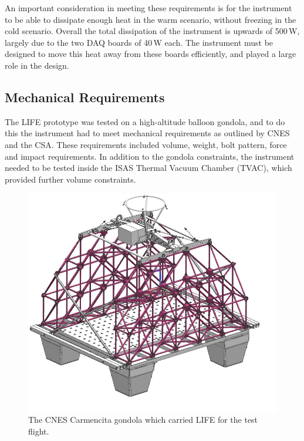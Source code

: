 An important consideration in meeting these requirements is for the instrument to be able to dissipate enough heat in the warm scenario, without freezing in the cold scenario. Overall the total dissipation of the instrument is upwards of 500\,W, largely due to the two DAQ boards of 40\,W each. The instrument must be designed to move this heat away from these boards efficiently, and played a large role in the design.

\subsection{Mechanical Requirements}
The LIFE prototype was tested on a high-altitude balloon gondola, and to do this the instrument had to meet mechanical requirements as outlined by CNES and the CSA. These requirements included volume, weight, bolt pattern, force and impact requirements. In addition to the gondola constraints, the instrument needed to be tested inside the ISAS Thermal Vacuum Chamber (TVAC), which provided further volume constraints.

\begin{figure}[h]
\centering
  \includegraphics[width=0.7\linewidth]{chap3_images/Carmencita_empty.png}
  \caption{The CNES Carmencita gondola which carried LIFE for the test flight.}
  \label{fig:Carmencita_empty}
\end{figure}

